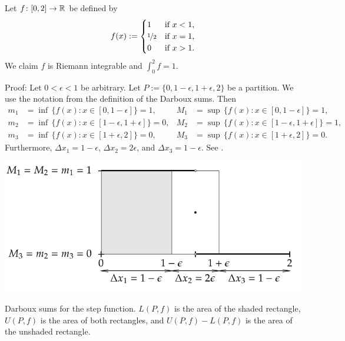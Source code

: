 \begin{example}
Let $f \colon [0,2] \to {\mathbb{R}}$ be defined by
\begin{equation*}
f(x) :=
\begin{cases}
1               & \text{if } x < 1,\\
\nicefrac{1}{2} & \text{if } x = 1,\\
0               & \text{if } x > 1.
\end{cases}
\end{equation*}
We claim $f$ is Riemann integrable and $\int_0^2 f = 1$.

Proof: Let $0 < \epsilon < 1$ be arbitrary.
Let $P := \{0, 1-\epsilon, 1+\epsilon, 2\}$ be a partition.  We use the notation from
the definition of the Darboux sums.  Then
\begin{align*}
m_1 &= \inf \, \bigl\{ f(x) : x \in [0,1-\epsilon] \bigr\} = 1 , & 
M_1 &= \sup \, \bigl\{ f(x) : x \in [0,1-\epsilon] \bigr\} = 1 , \\
m_2 &= \inf \, \bigl\{ f(x) : x \in [1-\epsilon,1+\epsilon] \bigr\} = 0 , & 
M_2 &= \sup \, \bigl\{ f(x) : x \in [1-\epsilon,1+\epsilon] \bigr\} = 1 , \\
m_3 &= \inf \, \bigl\{ f(x) : x \in [1+\epsilon,2] \bigr\} = 0 , & 
M_3 &= \sup \, \bigl\{ f(x) : x \in [1+\epsilon,2] \bigr\} = 0 .
\end{align*}
Furthermore, $\Delta x_1 = 1-\epsilon$, $\Delta x_2 = 2\epsilon$, and
$\Delta x_3 = 1-\epsilon$.
See .
\begin{myfigureht}
\includegraphics{figures/darbouxfigstep}
\caption{Darboux sums for the step function.  $L(P,f)$ is the area of the
shaded rectangle, $U(P,f)$ is the area of both rectangles, and
$U(P,f)-L(P,f)$ is the area of the unshaded rectangle.\label{darbouxfigstep}}
\end{myfigureht}


\end{example}
